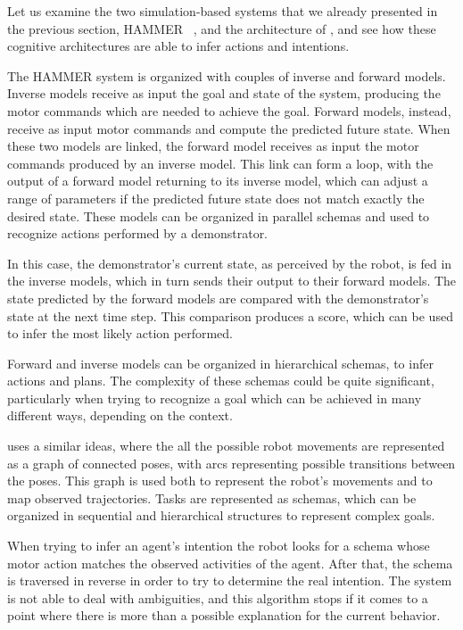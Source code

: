 Let us examine the two simulation-based systems that we already presented in the previous section, HAMMER ~\cite{demiris2007prediction}, and the architecture of \cite{BreazealGB09}, and see how these cognitive architectures are able to infer actions and intentions.

The HAMMER system is organized with couples of inverse and forward models.  Inverse models receive as input the goal and state of the system, producing the motor commands which are needed to achieve the goal. Forward models, instead, receive as input motor commands and compute the predicted future state. When these two models are linked, the forward model receives as input the motor commands produced by an inverse model. This link can form a loop, with the output of a forward model returning to its inverse model, which can adjust a range of parameters if the predicted future state does not match exactly the desired state. These models can be organized in parallel schemas and used to recognize actions performed by a demonstrator. 

In this case, the demonstrator's current state, as perceived by the robot, is fed in the inverse models, which in turn sends their output to their forward models. The state predicted by the forward models are compared with the demonstrator's state at the next time step. This comparison produces a score, which can be used to infer the most likely action performed. 

Forward and inverse models can be organized in hierarchical schemas, to infer actions and plans. The complexity of these schemas could be quite significant, particularly when trying to recognize a goal which can be achieved in many different ways, depending on the context. 

\cite{BreazealGB09} uses a similar ideas, where the all the possible robot movements are represented as a graph of connected poses, with arcs representing possible transitions between the poses. This graph is used both to represent the robot's movements and to map observed trajectories. Tasks are represented as schemas, which can be organized in sequential and hierarchical structures to represent complex goals.

 When trying to infer an agent's intention the robot looks for a schema whose motor action matches the observed activities of the agent. After that, the schema is traversed in reverse in order to try to determine the real intention. The system is not able to deal with ambiguities, and this algorithm stops if it comes to a point where there is more than a possible explanation for the current behavior. 

